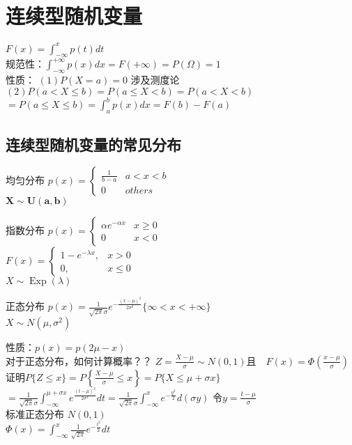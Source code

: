 \documentclass[cn,11pt,chinese,black]{elegantbook}
\begin{document}
\section{连续型随机变量 }
$F(x)=\int_{-\infty}^{x} p(t) d t$\\
规范性：$\int_{-\infty}^{+\infty} p(x) d x=F(+\infty)=P(\Omega)=1$\\
性质：
$(1)P(X=a)=0$ 涉及测度论\\
$(2)P(a<X \leq b)=P(a \leq X<b)=P(a<X<b)$\\
$=P(a \leq X \leq b)=\int_{a}^{b} p(x) d x=F(b)-F(a)$
\subsection{连续型随机变量的常见分布}
\begin{definition}{均匀分布}
$p(x)=\left\{\begin{array}{ll}{\frac{1}{b-a}} & {a<x<b} \\ {0} & {others}\end{array}\right.$\\
$\boldsymbol{X} \sim \boldsymbol{U}(\boldsymbol{a}, \boldsymbol{b})$
\end{definition}
\begin{definition}{指数分布}
$p(x)=\left\{\begin{array}{ll}{\alpha e^{-\alpha x}} & {x \geq 0} \\ {0} & {x<0}\end{array}\right.$\\
$F(x)=\left\{\begin{array}{cc}{1-e^{-\lambda x},} & {x>0} \\ {0,} & {x \leq 0}\end{array}\right.$\\
$X \sim \operatorname{Exp}(\lambda)$
\end{definition}
\begin{definition}{正态分布}
$p(x)=\frac{1}{\sqrt{2 \pi} \sigma} e^{-\frac{(x-\mu)^{2}}{2 \sigma^{2}}}\lbrace \infty<x<+\infty \rbrace$ \\
$X \sim N\left(\mu, \sigma^{2}\right)$
\end{definition}

性质：$p(x)=p(2 \mu-x)$\\
对于正态分布，如何计算概率？？
$Z=\frac{X-\mu}{\sigma} \sim N(0,1)且\quad F(x)=\Phi\left(\frac{x-\mu}{\sigma}\right)$\\
证明$P\{Z \leq x\}=P\left\{\frac{X-\mu}{\sigma} \leq x\right\}=P\{X \leq \mu+\sigma x\}$\\
$=\frac{1}{\sqrt{2 \pi} \sigma} \int_{-\infty}^{\mu+\sigma x} e^{\frac{(t-\mu)^{2}}{2 \sigma^{2}}} d t= \frac{1}{\sqrt{2 \pi} \sigma} \int_{-\infty}^{x} e^{-\frac{y^{2}}{2}} d(\sigma y)$ 令$y=\frac{t-\mu}{\sigma}$\\
标准正态分布 $N(0,1)$\\
$\Phi(x)=\int_{-\infty}^{x} \frac{1}{\sqrt{2 \pi}} e^{-\frac{t^{2}}{2}} d t$
\end{document}
